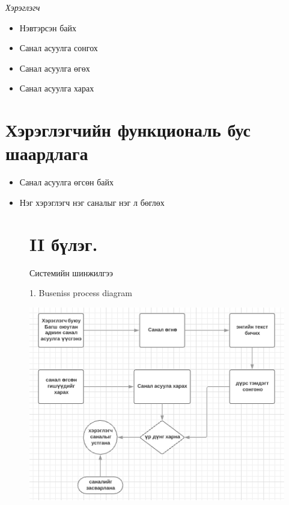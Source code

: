 \documentclass[12pt]{article}
\begin{document}
	\textit {Хэрэглэгч}
	\begin{itemize}
		[label=*, nosep]
		\item Нэвтэрсэн байх
		\item Санал асуулга сонгох
		\item Санал асуулга өгөх 
		\item Санал асуулга харах
	\end{itemize}	
	
	
	\section{Хэрэглэгчийн функциональ бус шаардлага}
	\begin{center}
	\begin{itemize}
		[label=*, nosep]
		\item Санал асуулга өгсөн байх 
		\item Нэг хэрэглэгч нэг саналыг нэг л бөглөх
    \end{itemize}
	\end{center}
    






	
	\begin{figure}  \section       {II бүлэг.}  
		
		         Системийн шинжилгээ
		
		1.     Buseniss process diagram
		
		
		\centering
	   	\includegraphics[width=0.7\linewidth]{./p}
		\caption{}
		\label{fig:p}
			\end{figure}
		
\end{document}
